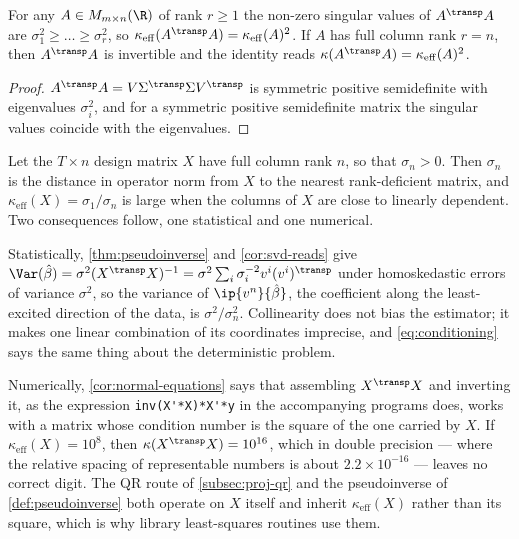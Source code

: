 \begin{corollary}\label{cor:normal-equations}
	For any $A\in M_{m\times n}(\R)$ of rank $r\geq1$ the non-zero singular values
	of $A^{\transp}A$ are $\sigma_1^2\geq\dots\geq\sigma_r^2$, so
	$\kappa_{\mathrm{eff}}(A^{\transp}A)=\kappa_{\mathrm{eff}}(A)^2$. If $A$ has
	full column rank $r=n$, then $A^{\transp}A$ is invertible and the identity
	reads $\kappa(A^{\transp}A)=\kappa_{\mathrm{eff}}(A)^{2}$.
\end{corollary}

\begin{proof}
	$A^{\transp}A=V\Sigma^{\transp}\Sigma V^{\transp}$ is symmetric positive
	semidefinite with eigenvalues $\sigma_i^2$, and for a symmetric positive
	semidefinite matrix the singular values coincide with the eigenvalues.
\end{proof}

\begin{remark}\label{rem:collinearity}
	Let the $T\times n$ design matrix $X$ have full column rank $n$, so that
	$\sigma_n>0$. Then $\sigma_n$ is the distance in operator norm from $X$ to the
	nearest rank-deficient matrix, and $\kappa_{\mathrm{eff}}(X)=\sigma_1/\sigma_n$
	is large when the columns of $X$ are close to linearly dependent. Two
	consequences follow, one statistical and one numerical.

	Statistically, \autoref{thm:pseudoinverse} and \autoref{cor:svd-reads} give
	$\Var(\hat\beta)=\sigma^2(X^{\transp}X)^{-1}
		=\sigma^2\sum_{i}\sigma_i^{-2}v^i(v^i)^{\transp}$ under homoskedastic errors
	of variance $\sigma^2$, so the variance of $\ip{v^n}{\hat\beta}$, the
	coefficient along the least-excited direction of the data, is
	$\sigma^2/\sigma_n^2$. Collinearity does not bias the estimator; it makes one
	linear combination of its coordinates imprecise, and \eqref{eq:conditioning}
	says the same thing about the deterministic problem.

	Numerically, \autoref{cor:normal-equations} says that assembling
	$X^{\transp}X$ and inverting it, as the expression \verb|inv(X'*X)*X'*y| in
	the accompanying programs does, works with a matrix whose condition number is
	the square of the one carried by $X$. If $\kappa_{\mathrm{eff}}(X)=10^{8}$,
	then $\kappa(X^{\transp}X)=10^{16}$, which in double precision --- where the
	relative spacing of representable numbers is about $2.2\times10^{-16}$ ---
	leaves no correct digit. The QR route of \autoref{subsec:proj-qr} and the
	pseudoinverse of \autoref{def:pseudoinverse} both operate on $X$ itself and
	inherit $\kappa_{\mathrm{eff}}(X)$ rather than its square, which is why
	library least-squares routines use them.
\end{remark}

